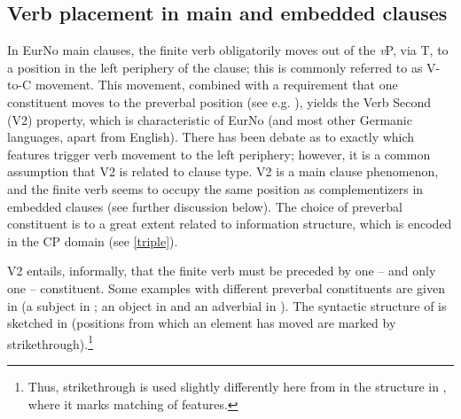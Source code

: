 \documentclass[output=paper,colorlinks,citecolor=brown]{langscibook}
\begin{document}
\subsection{Verb placement in main and embedded clauses}\label{subsec:verbplacement}
In EurNo main clauses, the finite verb obligatorily moves out of the \emph{v}P, via T, to a position in the left periphery of the clause; this is commonly referred to as V-to-C movement. This movement, combined with a requirement that one constituent moves to the preverbal position (see e.g. \citealt{holmberg2015V2}), yields the Verb Second (V2) property, which is  characteristic  of EurNo (and most other Germanic languages, apart from English). There has been debate as to exactly which features trigger verb movement to the left periphery; however, it is a common assumption  that V2 is related to clause type. V2 is a main clause phenomenon, and the finite verb seems to occupy the same position as complementizers in embedded clauses (see further discussion below). The choice of preverbal constituent is to a great extent related to information structure, which is encoded in the CP domain (see \ref{triple}).  

V2 entails, informally, that the finite verb must be preceded by one -- and only one -- constituent. Some examples with different preverbal constituents are given in  (a subject in ; an object in  and an adverbial in ). The syntactic structure of  is sketched in  (positions  from which an element has moved are marked by strikethrough).\footnote{Thus, strikethrough is used slightly differently here from in the structure in , where it marks matching of features.} 
\end{document}

